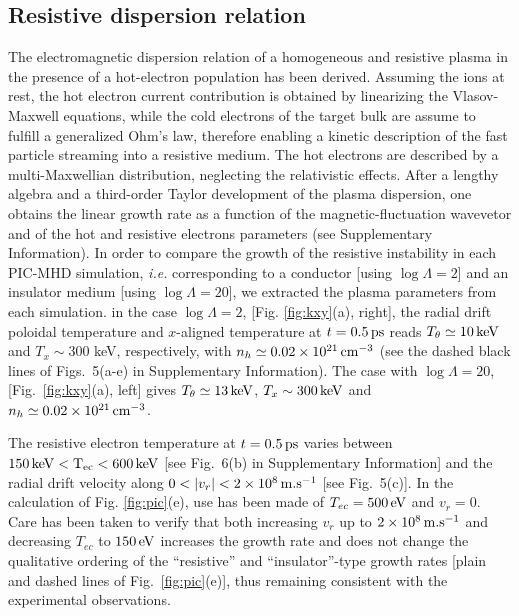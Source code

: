 \documentclass[aps,twocolumn,showpacs,superscriptaddress]{revtex4}
\begin{document}
\subsection*{ Resistive dispersion relation}
The electromagnetic dispersion relation of a homogeneous and resistive plasma in the presence of a hot-electron population has been derived. 
Assuming the ions at rest,  the hot electron current contribution is obtained by linearizing the Vlasov-Maxwell equations, while the cold electrons  of the target bulk are assume to fulfill a generalized Ohm's law, therefore enabling a kinetic description of the fast particle streaming into a resistive medium.
The  hot electrons are described by a  multi-Maxwellian distribution, neglecting the relativistic effects.
After a lengthy algebra and  a third-order Taylor development of the plasma dispersion, one obtains the linear growth rate as a function of the magnetic-fluctuation wavevetor and of the hot and resistive electrons parameters  (see Supplementary Information).
In order to compare the growth of the resistive instability in each PIC-MHD simulation, \emph{i.e.} corresponding to a conductor  [using $\log \Lambda=2$] and  an insulator medium [using $\log \Lambda=20$], we  extracted the plasma parameters from each simulation. 
in the case $\log \Lambda=2$, [Fig. \ref{fig:kxy}(a), right], the radial drift  poloidal temperature and $x$-aligned temperature at $t=0.5\,\rm ps$ reads
$T_\theta \simeq 10\,\rm keV$ and 
$T_x \sim 300$ keV, respectively, with $n_h\simeq 0.02 \times 10^{21}\,\rm cm^{-3}$ (see the dashed black lines of Figs.~5(a-e) in Supplementary Information). The case with $\log \Lambda =20$, [Fig.~\ref{fig:kxy}(a), left] gives $T_\theta \simeq 13\,\rm keV$,
$T_x \sim 300\,\rm keV$ and $n_h\simeq 0.02 \times 10^{21}\,\rm cm^{-3}$. 

The resistive electron temperature at $t=0.5\,\rm ps$ varies between $150\,\rm keV <T_{ec} < 600\,\rm keV$ [see Fig.~6(b) in Supplementary Information] and the radial drift velocity along $0< \vert v_r \vert <2\times 10^8 \,\rm m.s^{-1}$ [see Fig.~5(c)]. 
In the calculation of Fig. \ref{fig:pic}(e), use has been made of $T_{ec}=500\,\rm eV$ and $v_r = 0$.
Care has been taken to verify that both increasing $v_r$ up to $2\times 10^8 \,\rm m.s^{-1}$ and decreasing $T_{ec}$ to $150\,\rm eV$ increases the growth rate and does not change the qualitative ordering of the ``resistive'' and ``insulator''-type growth rates [plain and dashed lines of Fig.~\ref{fig:pic}(e)], thus remaining consistent with the experimental observations.
\end{document}
